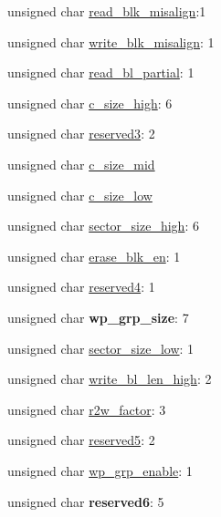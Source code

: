 \begin{DoxyCompactItemize}
\item 
unsigned char \hyperlink{struct_c_s_d_v2_ab66c3e7d5735885b0b3799870e6caf20}{read\+\_\+blk\+\_\+misalign}\+:1
\item 
unsigned char \hyperlink{struct_c_s_d_v2_ab80757f726c43476d311c5a0be8351e0}{write\+\_\+blk\+\_\+misalign}\+: 1
\item 
unsigned char \hyperlink{struct_c_s_d_v2_ac65ab71e8c96fd52f91431762c2b4bd8}{read\+\_\+bl\+\_\+partial}\+: 1
\item 
unsigned char \hyperlink{struct_c_s_d_v2_a18b212514052366ee8cc2f28bd945f83}{c\+\_\+size\+\_\+high}\+: 6
\item 
unsigned char \hyperlink{struct_c_s_d_v2_a0887f10de0b3c907a56f8a89d925e1a1}{reserved3}\+: 2
\item 
unsigned char \hyperlink{struct_c_s_d_v2_a18a7efb31f3db1178cb5fb5be7111a43}{c\+\_\+size\+\_\+mid}
\item 
unsigned char \hyperlink{struct_c_s_d_v2_a51f11aace6d410815922936272328ca9}{c\+\_\+size\+\_\+low}
\item 
unsigned char \hyperlink{struct_c_s_d_v2_a09c942079f7d4e1a26d26d4cfe9d15c5}{sector\+\_\+size\+\_\+high}\+: 6
\item 
unsigned char \hyperlink{struct_c_s_d_v2_a968e8021601578943a05e7a0397a2040}{erase\+\_\+blk\+\_\+en}\+: 1
\item 
unsigned char \hyperlink{struct_c_s_d_v2_a50b06e2c85cc95c0adc08b18c97d7cb3}{reserved4}\+: 1
\item 
unsigned char {\bfseries wp\+\_\+grp\+\_\+size}\+: 7\hypertarget{struct_c_s_d_v2_a8e3d189a715bd9797b1fa1aa32e24c72}{}\label{struct_c_s_d_v2_a8e3d189a715bd9797b1fa1aa32e24c72}

\item 
unsigned char \hyperlink{struct_c_s_d_v2_acd516f06ea0b926fa1580034a6efb9c6}{sector\+\_\+size\+\_\+low}\+: 1
\item 
unsigned char \hyperlink{struct_c_s_d_v2_af6592d240bf4b0c0d8b8a034d9fb1041}{write\+\_\+bl\+\_\+len\+\_\+high}\+: 2
\item 
unsigned char \hyperlink{struct_c_s_d_v2_a72c641974e9b6e4c8877454c4a378c6a}{r2w\+\_\+factor}\+: 3
\item 
unsigned char \hyperlink{struct_c_s_d_v2_acb8d47b0517908d08d12f0d8f3b2cc74}{reserved5}\+: 2
\item 
unsigned char \hyperlink{struct_c_s_d_v2_a98cf0c80369604ba372c22a0453f9e76}{wp\+\_\+grp\+\_\+enable}\+: 1
\item 
unsigned char {\bfseries reserved6}\+: 5\hypertarget{struct_c_s_d_v2_aa38e8b793eb8d8629956bb8ffbd6c4cc}{}\label{struct_c_s_d_v2_aa38e8b793eb8d8629956bb8ffbd6c4cc}


\end{DoxyCompactItemize}
